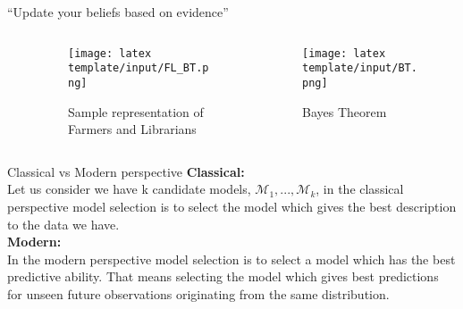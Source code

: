 \documentclass[t, aspectratio=169]{beamer}
\begin{document}
\begin{frame}{“Update your beliefs based on evidence”}
 \begin{columns}[onlytextwidth]\


\begin{column}{0.6\textwidth}
 \begin{figure}

        \texttt{[image: latex template/input/FL\_BT.png]}
        \caption{Sample representation of Farmers and Librarians \cite{2FLratio}}
    \end{figure}
\end{column}

   \begin{column}{.4\textwidth}
     \begin{figure}
    \centering
        \texttt{[image: latex template/input/BT.png]}
        \caption{Bayes Theorem}
    \end{figure}
   \end{column}
 \end{columns}
 \end{frame}
 


 \begin{frame}{Classical vs Modern perspective}
 \vspace{1cm}
 \textbf{Classical:}\\
\vspace{0.5cm}
Let us consider we have k candidate models, \(\mathcal{M}_1, ... , \mathcal{M}_k\), in the classical perspective model selection is to select the model which gives the best description to the data we have.\\
 \vspace{1.5cm}
\textbf{Modern:}\\
\vspace{0.5cm}
In the modern perspective model selection is to select a model which has the best predictive ability. That means selecting the model which gives best predictions for unseen future observations originating from the same distribution.

 \end{frame} 

\end{document}
